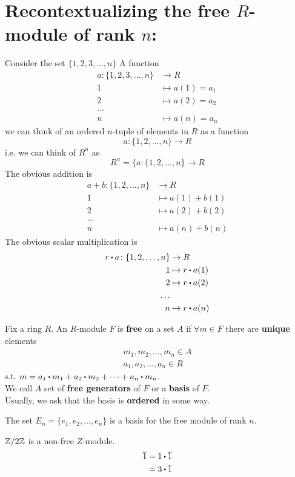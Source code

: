 \documentclass[../Main.tex]{subfiles}
\begin{document}
\section*{Recontextualizing the free $R$-module of rank $n$:}
Consider the set $\{1,2,3,\dots,n\}$ 
A function 
\begin{align*}
a\colon \{1,2,3,\dots,n\} &\to R\\
1&\mapsto a(1)=a_1\\
2&\mapsto a(2)=a_2\\
\dots\\
n&\mapsto a(n)=a_n
\end{align*}
we can think of an ordered $n$-tuple of elements in $R$ as a function
\[a\colon\{1,2,\dots,n\}\to R\]
i.e. we can think of $R^n$ as
\[R^n=\{a\colon \{1,2,\dots,n\}\to R\]
The obvious addition is
\begin{align*}
a+b\colon \{1,2,\dots,n\} &\to R\\
1&\mapsto a(1)+b(1)\\
2&\mapsto a(2)+b(2)\\
\dots\\
n&\mapsto a(n)+b(n)
\end{align*}
The obvious scalar multiplication is
\begin{align*}
r\rdot a\colon \{1,2,\dots,n\} &\to R\\
1&\mapsto r\rdot a(1)\\
2&\mapsto r\rdot a(2)\\
\dots\\
n&\mapsto r\rdot a(n)
\end{align*}
\begin{dfn}
Fix a ring $R$. An $R$-module $F$ is \textbf{free} on a set $A$ if $\forall m\in F$ there are \textbf{unique} elements 
\begin{align*}
m_1,m_2,\dots,m_n\in A\\
a_1,a_2,\dots,a_n\in R
\end{align*}
s.t. $m=a_1\rdot m_1+a_2\rdot m_2+\dots+a_n\rdot m_n$.\\
We call $A$ set of \textbf{free generators} of $F$ or a \textbf{basis} of $F$.\\
\Note Usually, we ask that the basis is \textbf{ordered} in some way.
\end{dfn}
\begin{example}
	The set $E_n=\{e_1,e_2,\dots,e_n\}$ is a basis for the free module of rank $n$.
\end{example}
\begin{example}
	$\mathbb{Z}/2\mathbb{Z}$ is a non-free $Z$-module.
	\begin{align*}
	\obar{1}&=1\rdot \obar{1}\\
	&=3\rdot \obar{1}
	\end{align*}
\end{example}
\end{document}
